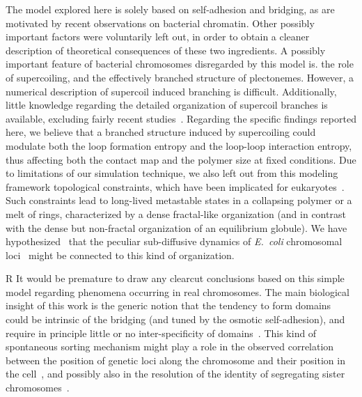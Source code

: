 \documentclass[
preprint,
a4paper,
12pt,
superscriptaddress,
pre]{revtex4}
\begin{document}
The model explored here is solely based on self-adhesion and bridging,
as are motivated by recent observations on bacterial chromatin.  Other
possibly important factors were voluntarily left out, in order to
obtain a cleaner description of theoretical consequences of these two
ingredients. 
%
A possibly important feature of bacterial chromosomes disregarded by
this model is. the role of supercoiling, and the effectively branched
structure of plectonemes.  However, a numerical description of
supercoil induced branching is difficult. Additionally, little
knowledge regarding the detailed organization of supercoil branches is
available, excluding fairly recent studies~\cite{Le2013}.
%
Regarding the specific findings reported here, we believe that a
branched structure induced by supercoiling could modulate both the
loop formation entropy and the loop-loop interaction entropy, thus
affecting both the contact map and the polymer size at fixed
conditions. 
%
%
Due to limitations of our simulation technique, we also left out from this
modeling framework topological constraints, which have been implicated
for eukaryotes~\cite{Mirny2011,Halverson2014}. Such constraints lead
to long-lived metastable states in a collapsing polymer or a melt of
rings, characterized by a dense fractal-like organization (and in
contrast with the dense but non-fractal organization of an equilibrium
globule). We have hypothesized~\cite{Benza2012} that the peculiar
sub-diffusive dynamics of \emph{E.~coli} chromosomal
loci~\cite{Weber2010,Javer2013} might be connected to this kind of
organization.

R%
It would be premature to draw any clearcut conclusions based on this
simple model regarding phenomena occurring in real chromosomes.  The
main biological insight of this work is the generic notion that the
tendency to form domains could be intrinsic of the bridging (and tuned
by the osmotic self-adhesion), and require in principle little or no
inter-specificity of domains~\cite{Barbieri2012}.  This kind of
spontaneous sorting mechanism might play a role in the observed correlation
between the position of genetic loci along the chromosome and their
position in the cell~\cite{Wiggins2010,Mercier2008}, and possibly also
in the resolution of the identity of segregating sister
chromosomes~\cite{Lesterlin2012}.
\end{document}
